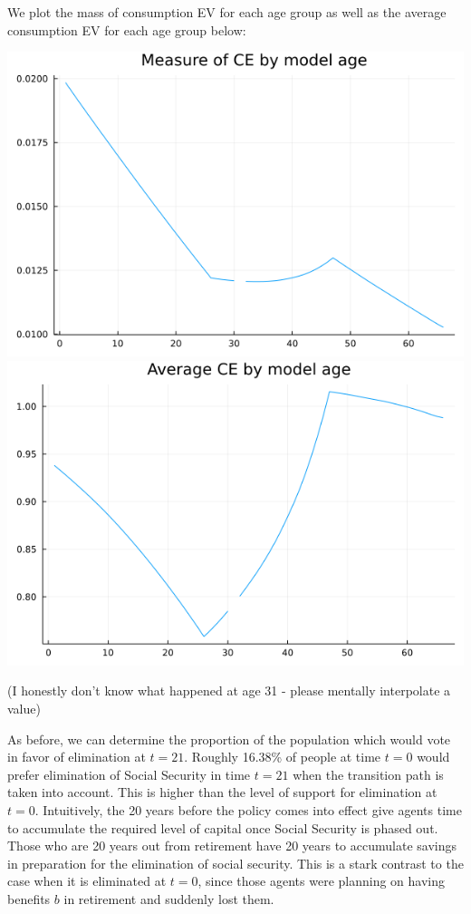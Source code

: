 \documentclass[12pt]{article}
\begin{document}
We plot the mass of consumption EV for each age group as well as the average consumption EV for each age group below:
\begin{center}
    \includegraphics[scale=0.4]{cemeasage_21.png}
    \includegraphics[scale=0.4]{ceavgage_21.png}
\end{center}
(I honestly don't know what happened at age 31 - please mentally interpolate a value)

As before, we can determine the proportion of the population which would vote in favor of elimination at $t = 21$. Roughly 16.38\% of people at time $t=0$ would prefer elimination of Social Security in time $t=21$ when the transition path is taken into account. This is higher than the level of support for elimination at $t=0$. Intuitively, the 20 years before the policy comes into effect give agents time to accumulate the required level of capital once Social Security is phased out. Those who are 20 years out from retirement have 20 years to accumulate savings in preparation for the elimination of social security. This is a stark contrast to the case when it is eliminated at $t=0$, since those agents were planning on having benefits $b$ in retirement and suddenly lost them. 
\end{document}
